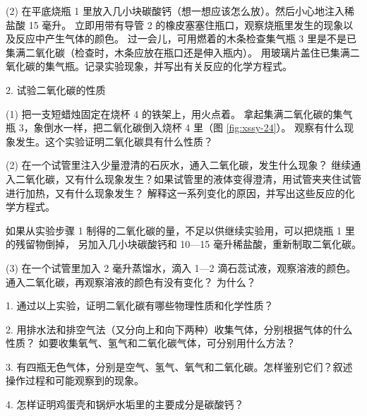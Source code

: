 \begin{shiyanbuzhou}
    (2) 在平底烧瓶 1 里放入几小块碳酸钙（想一想应该怎么放）。然后小心地注入稀盐酸 15 毫升。
    立即用带有导管 2 的橡皮塞塞住瓶口，观察烧瓶里发生的现象以及反应中产生气体的颜色。
    过一会儿，可用燃着的木条检查集气瓶 3 里是不是已集满二氧化碳（检查时，木条应放在瓶口还是伸入瓶内）。
    用玻璃片盖住已集满二氧化碳的集气瓶。记录实验现象，并写出有关反应的化学方程式。

    2. 试验二氧化碳的性质

    (1) 把一支短蜡烛固定在烧杯 4 的铁架上，用火点着。
    拿起集满二氧化碳的集气瓶 3，象倒水一样，把二氧化碳倒入烧杯 4 里（图 \ref{fig:xssy-24}）。
    观察有什么现象发生。这个实验证明二氧化碳具有什么性质？

    (2) 在一个试管里注入少量澄清的石灰水，通入二氧化碳，发生什么现象？
    继续通入二氧化碳，又有什么现象发生？如果试管里的液体变得澄清，用试管夹夹住试管进行加热，又有什么现象发生？
    解释这一系列变化的原因，并写出这些反应的化学方程式。

    如果从实验步骤 1 制得的二氧化碳的量，不足以供继续实验用，可以把烧瓶 1 里的残留物倒掉，
    另加入几小块碳酸钙和 10—15 毫升稀盐酸，重新制取二氧化碳。

    (3) 在一个试管里加入 2 毫升蒸馏水，滴入 1—2 滴石蕊试液，观察溶液的颜色。
    通入二氧化碳，再观察溶液的颜色有没有变化？ 为什么？
\end{shiyanbuzhou}


\begin{wentihetaolun}
    1. 通过以上实验，证明二氧化碳有哪些物理性质和化学性质？

    2. 用排水法和排空气法（又分向上和向下两种）收集气体，分别根据气体的什么性质？
    如要收集氧气、氢气和二氧化碳气体，可分别用什么方法？

    3. 有四瓶无色气体，分别是空气、氢气、氧气和二氧化碳。怎样鉴别它们？叙述操作过程和可能观察到的现象。

    4. 怎样证明鸡蛋壳和锅炉水垢里的主要成分是碳酸钙？
\end{wentihetaolun}

